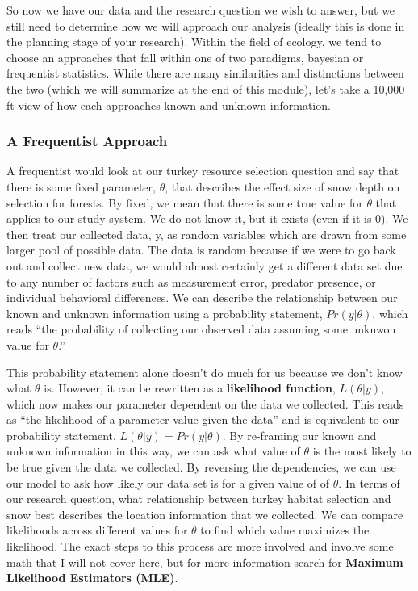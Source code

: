 \documentclass[
]{article}
\begin{document}
So now we have our data and the research question we wish to answer, but
we still need to determine how we will approach our analysis (ideally
this is done in the planning stage of your research). Within the field
of ecology, we tend to choose an approaches that fall within one of two
paradigms, bayesian or frequentist statistics. While there are many
similarities and distinctions between the two (which we will summarize
at the end of this module), let's take a 10,000 ft view of how each
approaches known and unknown information.

\hypertarget{a-frequentist-approach}{%
\subsubsection{A Frequentist Approach}\label{a-frequentist-approach}}

A frequentist would look at our turkey resource selection question and
say that there is some fixed parameter, \(\theta\), that describes the
effect size of snow depth on selection for forests. By fixed, we mean
that there is some true value for \(\theta\) that applies to our study
system. We do not know it, but it exists (even if it is 0). We then
treat our collected data, y, as random variables which are drawn from
some larger pool of possible data. The data is random because if we were
to go back out and collect new data, we would almost certainly get a
different data set due to any number of factors such as measurement
error, predator presence, or individual behavioral differences. We can
describe the relationship between our known and unknown information
using a probability statement, \(Pr(y|\theta)\), which reads ``the
probability of collecting our observed data assuming some unknwon value
for \(\theta\).''

This probability statement alone doesn't do much for us because we don't
know what \(\theta\) is. However, it can be rewritten as a
\textbf{likelihood function}, \(L(\theta|y)\), which now makes our
parameter dependent on the data we collected. This reads as ``the
likelihood of a parameter value given the data'' and is equivalent to
our probability statement, \(L(\theta|y) = Pr(y|\theta)\). By re-framing
our known and unknown information in this way, we can ask what value of
\(\theta\) is the most likely to be true given the data we collected. By
reversing the dependencies, we can use our model to ask how likely our
data set is for a given value of of \(\theta\). In terms of our research
question, what relationship between turkey habitat selection and snow
best describes the location information that we collected. We can
compare likelihoods across different values for \(\theta\) to find which
value maximizes the likelihood. The exact steps to this process are more
involved and involve some math that I will not cover here, but for more
information search for \textbf{Maximum Likelihood Estimators (MLE)}.
\end{document}
